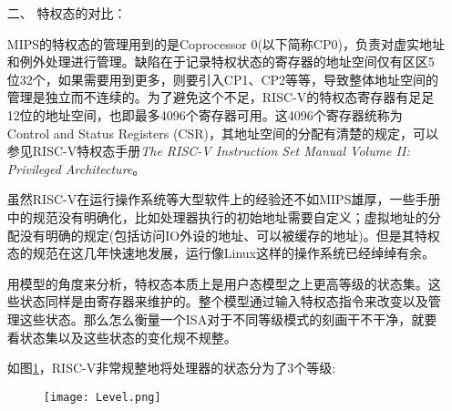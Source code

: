 \begin{enumerate}
	
	\item[二、] 特权态的对比：
	
	MIPS的特权态的管理用到的是Coprocessor 0(以下简称CP0)，负责对虚实地址和例外处理进行管理。缺陷在于记录特权状态的寄存器的地址空间仅有区区5位32个，如果需要用到更多，则要引入CP1、CP2等等，导致整体地址空间的管理是独立而不连续的。为了避免这个不足，RISC-V的特权态寄存器有足足12位的地址空间，也即最多4096个寄存器可用。这4096个寄存器统称为Control and Status Registers (CSR)，其地址空间的分配有清楚的规定，可以参见RISC-V特权态手册\textit{The RISC-V Instruction Set Manual Volume II: Privileged Architecture}\citep{privileged2017}。
	
	虽然RISC-V在运行操作系统等大型软件上的经验还不如MIPS雄厚，一些手册中的规范没有明确化，比如处理器执行的初始地址需要自定义；虚拟地址的分配没有明确的规定(包括访问IO外设的地址、可以被缓存的地址)。但是其特权态的规范在这几年快速地发展，运行像Linux这样的操作系统已经绰绰有余。
	
	用模型的角度来分析，特权态本质上是用户态模型之上更高等级的状态集。这些状态同样是由寄存器来维护的。整个模型通过输入特权态指令来改变以及管理这些状态。那么怎么衡量一个ISA对于不同等级模式的刻画干不干净，就要看状态集以及这些状态的变化规不规整。
	
	如图\ref{fig:mode}，RISC-V非常规整地将处理器的状态分为了3个等级:
	\begin{figure}[!htbp]
		\centering
		\texttt{[image: Level.png]}
		\label{fig:mode}
	\end{figure}
	

\end{enumerate}

